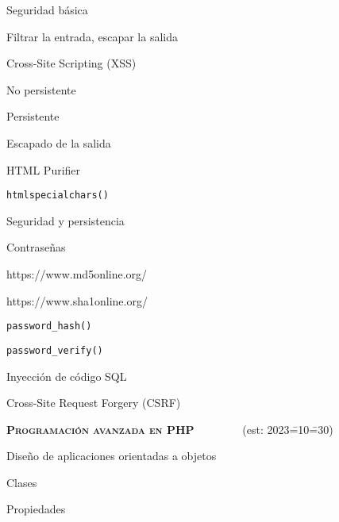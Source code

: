 \begin{longenum}
\begin{longenum}
        \item Seguridad básica
        \begin{longenum}
            \item Filtrar la entrada, escapar la salida
            \item Cross-Site Scripting (XSS)
            \begin{longenum}
                \item No persistente
                \item Persistente
                \item Escapado de la salida
                \begin{longenum}
                    \item HTML Purifier
                \end{longenum}
            \end{longenum}
            \item \texttt{htmlspecialchars()}
        \end{longenum}
        \item Seguridad y persistencia
        \begin{longenum}
            \item Contraseñas
            \begin{longenum}
                \item https://www.md5online.org/
                \item https://www.sha1online.org/
                \item \texttt{password\_hash()}
                \item \texttt{password\_verify()}
            \end{longenum}
            \item Inyección de código SQL
            \item Cross-Site Request Forgery (CSRF)
        \end{longenum}
    \end{longenum}
    \item \textbf{\textsc{Programación avanzada en PHP}} \ \ \ \ \ \ \ \ (est: 2023\==10\==30)
    \begin{longenum}
        \item Diseño de aplicaciones orientadas a objetos
        \begin{longenum}
            \item Clases
            \item Propiedades
            \begin{longenum}

\end{longenum}
\end{longenum}
\end{longenum}
\end{longenum}
